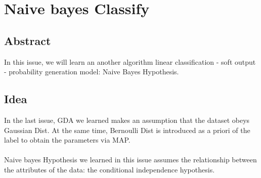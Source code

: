 \documentclass{report}
\begin{document}
\chapter{Naive bayes Classify}
\section{Abstract}
In this issue, we will learn an another algorithm linear classification - soft output - probability generation model: Naive Bayes Hypothesis.
\section{Idea}
In the last issue, GDA we learned makes an assumption that the dataset obeys Gaussian Dist. At the same time, Bernoulli Dist is introduced as a priori of the label to obtain the parameters via MAP.\\\\
Naive bayes Hypothesis we learned in this issue assumes the relationship between the attributes of the data: the conditional independence hypothesis.
\end{document}
